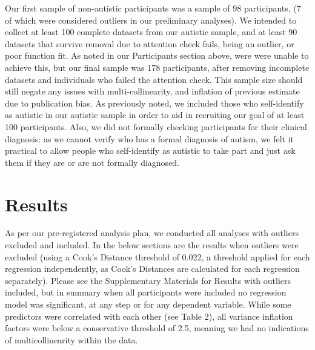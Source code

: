 \documentclass[
]{article}
\begin{document}
Our first sample of non-autistic participants was a sample of 98 participants, (7 of which were considered outliers in our preliminary analyses). We intended to collect at least 100 complete datasets from our autistic sample, and at least 90 datasets that survive removal due to attention check fails, being an outlier, or poor function fit. As noted in our Participants section above, were were unable to achieve this, but our final sample was 178 participants, after removing incomplete datasets and individuals who failed the attention check. This sample size should still negate any issues with multi-collinearity, and inflation of previous estimate due to publication bias. As previously noted, we included those who self-identify as autistic in our autistic sample in order to aid in recruiting our goal of at least 100 participants. Also, we did not formally checking participants for their clinical diagnosis: as we cannot verify who has a formal diagnosis of autism, we felt it practical to allow people who self-identify as autistic to take part and just ask them if they are or are not formally diagnosed.

\hypertarget{results}{%
\section*{Results}\label{results}}

As per our pre-registered analysis plan, we conducted all analyses with outliers excluded and included. In the below sections are the results when outliers were excluded (using a Cook's Distance threshold of 0.022, a threshold applied for each regression independently, as Cook's Distances are calculated for each regression separately). Please see the Supplementary Materials for Results with outliers included, but in summary when all participants were included no regression model was significant, at any step or for any dependent variable. While some predictors were correlated with each other (see Table 2), all variance inflation factors were below a conservative threshold of 2.5, meaning we had no indications of multicollinearity within the data.
\end{document}
